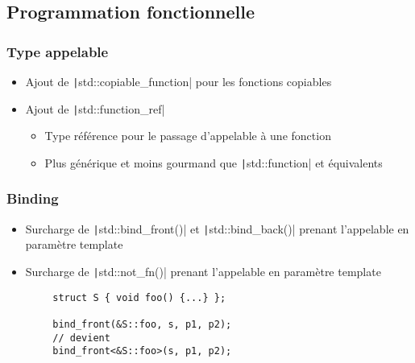 \documentclass[C++.tex]{subfiles}
\begin{document}
\subsection*{Programmation fonctionnelle}
\begin{frame}[fragile]
	\frametitle{Type appelable}
	\begin{itemize}
		\item Ajout de \texttt|std::copiable_function| pour les fonctions copiables
		\item Ajout de \texttt|std::function_ref|
		\begin{itemize}
			\item Type référence pour le passage d'appelable à une fonction
			\item Plus générique et moins gourmand que \texttt|std::function| et équivalents

		\end{itemize}
	\end{itemize}

\end{frame}

\begin{frame}[fragile]
	\frametitle{Binding}
	\begin{itemize}
		\item Surcharge de \texttt|std::bind_front()| et \texttt|std::bind_back()| prenant l'appelable en paramètre template
		\item Surcharge de \texttt|std::not_fn()| prenant l'appelable en paramètre template
	\end{itemize}

	\begin{verbatim}
		struct S { void foo() {...} };

		bind_front(&S::foo, s, p1, p2);
		// devient
		bind_front<&S::foo>(s, p1, p2);
	\end{verbatim}

\end{frame}
\end{document}
